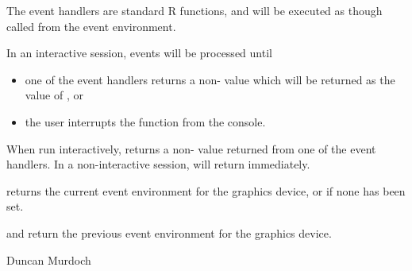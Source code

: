 \begin{Details}
\begin{itemize}
\end{itemize}


The event handlers are standard R functions, and will be executed as though called
from the event environment.  

In an interactive session, events will be processed until
\begin{itemize}

\item one of the event handlers returns
a non- value which will be returned as the value of
, or 
\item the user interrupts the function from the
console.

\end{itemize}

\end{Details}
%
\begin{Value}
When run interactively, 
 returns a non- value returned from one of the event handlers.
In a non-interactive session,  will return  immediately.

 returns the current event environment for the graphics device,
or  if none has been set.

 and  return the previous
event environment for the graphics device.
\end{Value}
%
\begin{Author}\relax
Duncan Murdoch
\end{Author}
%

